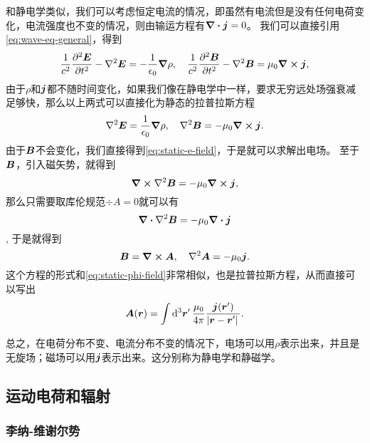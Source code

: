 \documentclass[UTF8, a4paper]{ctexart}
\begin{document}
和静电学类似，我们可以考虑恒定电流的情况，即虽然有电流但是没有任何电荷变化，电流强度也不变的情况，则由输运方程有$\div{\vb*{j}}=0$。
我们可以直接引用\eqref{eq:wave-eq-general}，得到
\[
    \frac{1}{c^2} \pdv[2]{\vb*{E}}{t} - \laplacian{\vb*{E}} = - \frac{1}{\epsilon_0} \grad{\rho} , \quad \frac{1}{c^2} \pdv[2]{\vb*{B}}{t} - \laplacian{\vb*{B}} = \mu_0 \curl{\vb*{j}},
\]
由于$\rho$和$\vb*{j}$都不随时间变化，如果我们像在静电学中一样，要求无穷远处场强衰减足够快，那么以上两式可以直接化为静态的拉普拉斯方程
\[
    \laplacian{\vb*{E}} = \frac{1}{\epsilon_0} \grad{\rho}, \quad \laplacian{\vb*{B}} = - \mu_0 \curl{\vb*{j}}.
\]
由于$\vb*{B}$不会变化，我们直接得到\eqref{eq:static-e-field}，于是就可以求解出电场。
至于$\vb*{B}$，引入磁矢势，就得到
\[
    \curl{\laplacian{\vb*{B}}} = - \mu_0 \curl{\vb*{j}},
\]
那么只需要取库伦规范$\div{A}=0$就可以有
\[
    \div{\laplacian{\vb*{B}}} = - \mu_0 \div{\vb*{j}}
\],
于是就得到
\begin{equation}
    \vb*{B} = \curl{\vb*{A}}, \quad \laplacian{\vb*{A}} = - \mu_0 \vb*{j}.
\end{equation}
这个方程的形式和\eqref{eq:static-phi-field}非常相似，也是拉普拉斯方程，从而直接可以写出
\begin{equation}
    \vb*{A}(\vb*{r}) = \int \dd[3]{\vb*{r}'} \frac{\mu_0}{4\pi} \frac{\vb*{j}(\vb*{r}')}{\abs*{\vb*{r} - \vb*{r}'}}.
    \label{eq:from-j-to-a}
\end{equation}

总之，在电荷分布不变、电流分布不变的情况下，电场可以用$\rho$表示出来，并且是无旋场；磁场可以用$\vb*{j}$表示出来。这分别称为静电学和静磁学。

\subsection{运动电荷和辐射}

\subsubsection{李纳-维谢尔势}
\end{document}
